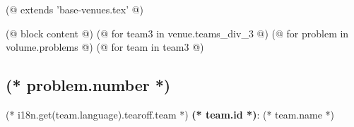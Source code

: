 (@ extends 'base-venues.tex' @)

(@ block content @)
    \pagestyle{tearoff}
    (@ for team3 in venue.teams_div_3 @)
        (@ for problem in volume.problems @)
            (@ for team in team3 @)%
                \setcounter{volume}{(* volume.number *)}%
                \setcounter{problem}{(* problem.number *)}%
                \setcounter{team}{(* team.id *)}%

                \begin{minipage}[t][96mm][t]{\textwidth}%
                    \begin{minipage}[t][88mm][t]{0.85\linewidth}%
                        \vspace{0pt}%
                        \subsection{\texorpdfstring{(* problem.number *)}{(* problem.number *). (* problem.id *)}}%
                        \setlength{\parskip}{6pt}
                    \end{minipage}%
                    \begin{minipage}[t][88mm][t]{0.15\linewidth}
                        \vspace{0mm}%
                        \hspace{4mm}%
                        \hspace{2pt}
                    \end{minipage}
                    {\small (* i18n.get(team.language).tearoff.team *) \textbf{(* team.id *)}: (* team.name *)}
                \end{minipage}%
